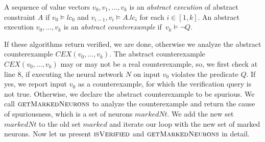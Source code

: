 \begin{df}
  A sequence of value vectors ${v_0}, {v_1}, ... , {v_k}$ is an 
  {\em abstract execution} of abstract constraint $A$ if 
  ${v_0} \models lc_0$ and ${v_{i-1}}, {v_i} \models A.lc_i$ for each $i \in [1,k]$.  
  An abstract execution ${v_0,...,v_k}$ is
  an {\em abstract counterexample} if~${v_k} \models \lnot Q$.
\end{df}

If these algorithms return verified, we are done, otherwise we analyze the abstract counterexample $CEX(v_0,...,v_k)$.
\sloppy The abstract counterexample $CEX(v_0,...,v_k)$ may or may not be a real counterexample, so, 
we first check at line 8, if executing the neural network $N$ on input $v_0$
violates the predicate $Q$.
If yes, we report input $v_0$ as a counterexample, for which the verification query is not true.
Otherwise, we declare the abstract counterexample to be spurious.
We call $\textsc{getMarkedNeurons}$ to analyze the counterexample and
return the cause of spuriousness, which is a set of neurons $markedNt$.
We add the new set $markedNt$ to the old set $marked$ and iterate our loop with the new set of marked neurons. Now let us present $\textsc{isVerified}$ and $\textsc{getMarkedNeurons}$ in detail.


%











